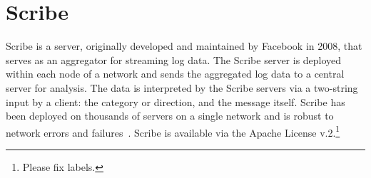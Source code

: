 \section{Scribe}

Scribe is a server, originally developed and maintained by Facebook in 2008,
that serves as an aggregator for streaming log data. The Scribe server is
deployed within each node of a network and sends the aggregated log data to a
central server for analysis. The data is interpreted by the Scribe servers via a
two-string input by a client: the category or direction, and the message
itself. Scribe has been deployed on thousands of servers on a single network and
is robust to network errors and failures~\cite{FBScribe}. Scribe is available
via the Apache License v.2.\footnote{Please fix labels.}
